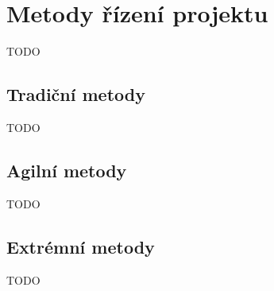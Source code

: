 \chapter{Metody řízení projektu}

TODO

\section{Tradiční metody}

TODO

\section{Agilní metody}

TODO

\section{Extrémní metody}

TODO
